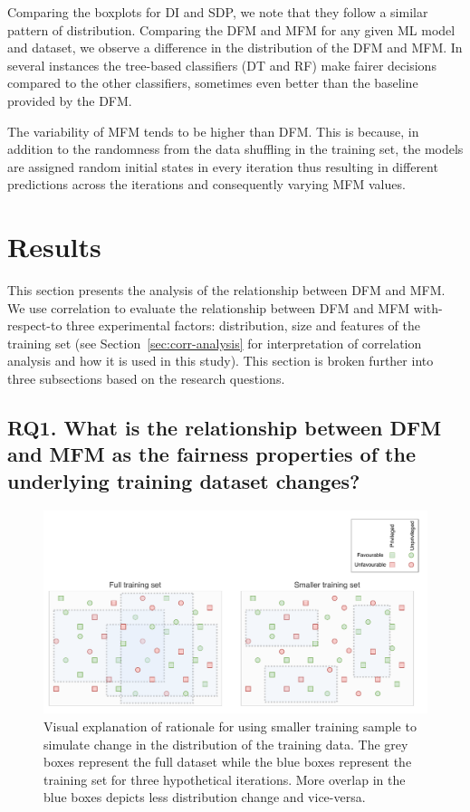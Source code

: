 \documentclass[conference,review,anonymous]{IEEEtran}
\begin{document}
Comparing the boxplots for DI and SDP, we note that they follow a
similar pattern of distribution. Comparing the DFM and MFM for any
given ML model and dataset, we observe a difference in the
distribution of the DFM and MFM. In several instances the tree-based
classifiers (DT and RF) make fairer decisions compared to the other
classifiers, sometimes even better than the baseline provided by the
DFM.

The variability of MFM tends to be higher than DFM. This is because,
in addition to the randomness from the data shuffling in the training
set, the models are assigned random initial states in every iteration
thus resulting in different predictions across the iterations and
consequently varying MFM values.

\section{Results}\label{sec:results}

This section presents the analysis of the relationship between DFM and
MFM. We use correlation to evaluate the relationship between DFM and
MFM with-respect-to three experimental factors: distribution, size and
features of the training set (see Section \ref{sec:corr-analysis} for
interpretation of correlation analysis and how it is used in this
study). This section is broken further into three subsections based on
the research questions.

\subsection{RQ1. What is the relationship between DFM and MFM as
the fairness properties of the underlying training dataset
changes?}\label{sec:results-full-rel}

\begin{figure}
  \centering
  \includegraphics[width=\linewidth]{shuffle.pdf}
  \caption{Visual explanation of rationale for using smaller training
    sample to simulate change in the distribution of the training
    data. The grey boxes represent the full dataset while the blue
    boxes represent the training set for three hypothetical
    iterations. More overlap in the blue boxes depicts less
    distribution change and vice-versa.}
  \label{fig:shuffle}
\end{figure}
\end{document}
